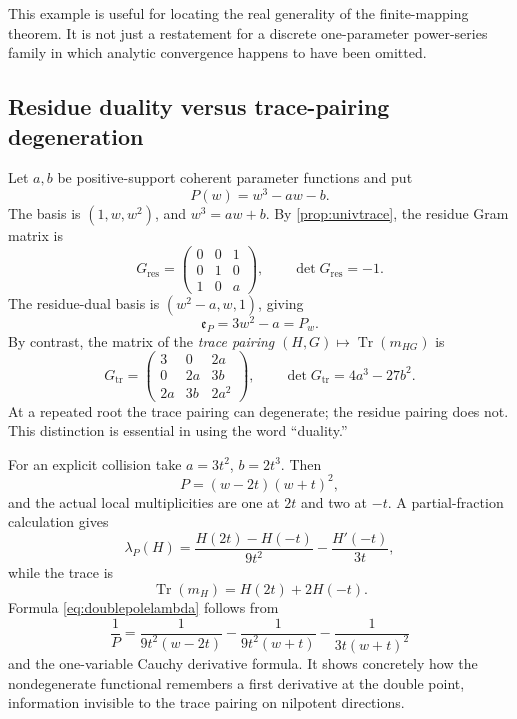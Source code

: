 \documentclass[11pt,oneside]{article}
\numberwithin{equation}{section}
\theoremstyle{definition}
\theoremstyle{remark}\newtheorem{remark}[theorem]{Remark}
\newcommand{\Tr}{\operatorname{Tr}}
\begin{document}
This example is useful for locating the real generality of the finite-mapping theorem. It is not just a restatement for a discrete one-parameter power-series family in which analytic convergence happens to have been omitted.

\subsection{Residue duality versus trace-pairing degeneration}\label{subsec:cubic}
Let \(a,b\) be positive-support coherent parameter functions and put
\[
 P(w)=w^3-aw-b.
\]
The basis is \((1,w,w^2)\), and \(w^3=aw+b\). By \cref{prop:univtrace}, the residue Gram matrix is
\begin{equation}\label{eq:cubicGram}
 G_{\mathrm{res}}=
 \begin{pmatrix}0&0&1\\0&1&0\\1&0&a\end{pmatrix},
 \qquad \det G_{\mathrm{res}}=-1.
\end{equation}
The residue-dual basis is \((w^2-a,w,1)\), giving
\[
 \mathfrak e_P=3w^2-a=P_w.
\]
By contrast, the matrix of the \emph{trace pairing} \((H,G)\mapsto\Tr(m_{HG})\) is
\begin{equation}\label{eq:cubictraceGram}
 G_{\mathrm{tr}}=
 \begin{pmatrix}
 3&0&2a\\0&2a&3b\\2a&3b&2a^2
 \end{pmatrix},
 \qquad \det G_{\mathrm{tr}}=4a^3-27b^2.
\end{equation}
At a repeated root the trace pairing can degenerate; the residue pairing does not. This distinction is essential in using the word ``duality.''

For an explicit collision take \(a=3t^2\), \(b=2t^3\). Then
\[
 P=(w-2t)(w+t)^2,
\]
and the actual local multiplicities are one at \(2t\) and two at \(-t\). A partial-fraction calculation gives
\begin{equation}\label{eq:doublepolelambda}
 \lambda_P(H)=
 \frac{H(2t)-H(-t)}{9t^2}-\frac{H'(-t)}{3t},
\end{equation}
while the trace is
\[
 \Tr(m_H)=H(2t)+2H(-t).
\]
Formula \eqref{eq:doublepolelambda} follows from
\[
 \frac1P=\frac1{9t^2(w-2t)}-
 \frac1{9t^2(w+t)}-\frac1{3t(w+t)^2}
\]
and the one-variable Cauchy derivative formula. It shows concretely how the nondegenerate functional remembers a first derivative at the double point, information invisible to the trace pairing on nilpotent directions.
\end{document}

